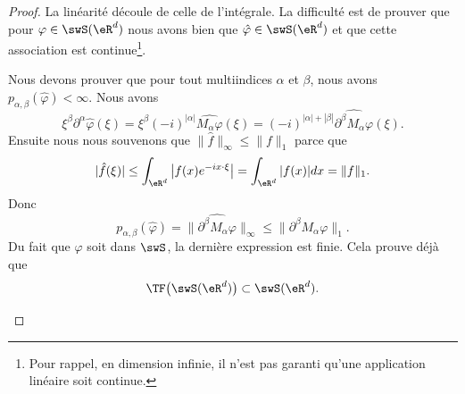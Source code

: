 \begin{proof}
	La linéarité découle de celle de l'intégrale. La difficulté est de prouver que pour \( \varphi\in\swS(\eR^d)\) nous avons bien que \( \hat\varphi\in\swS(\eR^d)\) et que cette association est continue\footnote{Pour rappel, en dimension infinie, il n'est pas garanti qu'une application linéaire soit continue.}.
	\begin{subproof}
		Nous devons prouver que pour tout multiindices \( \alpha\) et \( \beta\), nous avons \( p_{\alpha,\beta}(\hat\varphi)<\infty\). Nous avons
		\begin{equation}
			\xi^{\beta}\partial^{\alpha}\hat\varphi(\xi)=\xi^{\beta}(-i)^{| \alpha |}\widehat{M_{\alpha}\varphi}(\xi)=(-i)^{| \alpha |+| \beta |}\widehat{\partial^{\beta}M_{\alpha}\varphi}(\xi).
		\end{equation}
		Ensuite nous nous souvenons que \( \| \hat f \|_{\infty}\leq \| f \|_1\) parce que
		\begin{equation}
			| \hat f(\xi) |\leq\int_{\eR^d}\big| f(x) e^{-ix\cdot \xi} \big|=\int_{\eR^d}| f(x) |dx=\| f \|_1.
		\end{equation}
		Donc
		\begin{equation}
			p_{\alpha,\beta}(\hat\varphi)=\| \widehat{\partial^{\beta}M_{\alpha}\varphi} \|_{\infty}\leq \| \partial^{\beta}M_{\alpha}\varphi \|_1.
		\end{equation}
		Du fait que \( \varphi\) soit dans \( \swS\), la dernière expression est finie. Cela prouve déjà que
		\begin{equation}
			\TF\big( \swS(\eR^d) \big)\subset\swS(\eR^d).
		\end{equation}

		\spitem[Continuité]


\end{subproof}
\end{proof}
